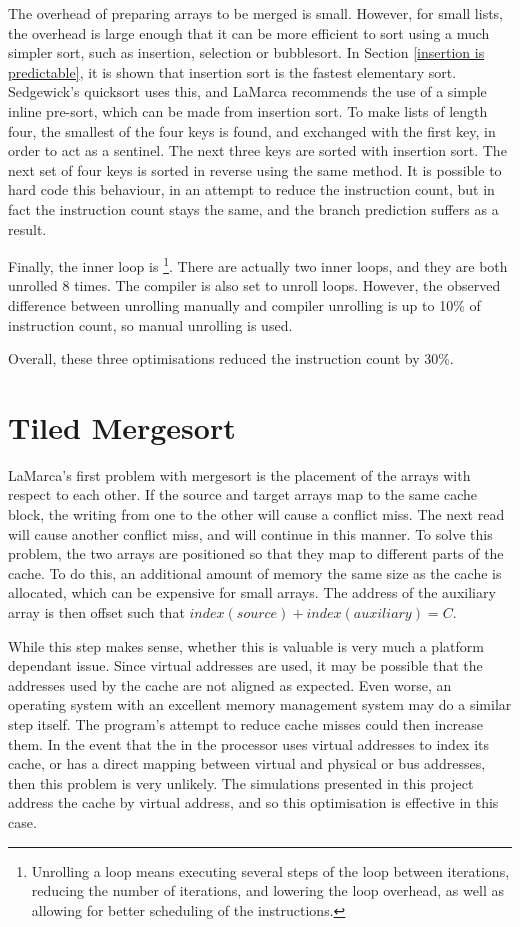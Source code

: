 The overhead of preparing arrays to be merged is small. However, for small
lists, the overhead is large enough that it can be more efficient to sort using
a much simpler sort, such as insertion, selection or bubblesort. In Section
\ref{insertion is predictable}, it is shown that insertion sort is the fastest
elementary sort.  Sedgewick's quicksort uses this, and LaMarca recommends the
use of a simple inline pre-sort, which can be made from insertion sort. To make
lists of length four, the smallest of the four keys is found, and exchanged
with the first key, in order to act as a sentinel. The next three keys are
sorted with insertion sort. The next set of four keys is sorted in reverse
using the same method. It is possible to hard code this behaviour, in an attempt
to reduce the instruction count, but in fact the instruction count stays the
same, and the branch prediction suffers as a result.

Finally, the inner loop is \footnote{Unrolling a loop means
executing several steps of the loop between iterations, reducing the number of
iterations, and lowering the loop overhead, as well as allowing for better
scheduling of the instructions.}.  There are actually two inner loops, and they
are both unrolled 8 times. The compiler is also set to unroll loops. However,
the observed difference between unrolling manually and compiler unrolling is up
to 10\% of instruction count, so manual unrolling is used.

Overall, these three optimisations reduced the instruction count by 30\%.

\section{Tiled Mergesort}
LaMarca's first problem with mergesort is the placement of the arrays with
respect to each other. If the source and target arrays map to the same cache
block, the writing from one to the other will cause a conflict miss. The next
read will cause another conflict miss, and will continue in this manner. To
solve this problem, the two arrays are positioned so that they map to different
parts of the cache. To do this, an additional amount of memory the same size as
the cache is allocated, which can be expensive for small arrays. The address of
the auxiliary array is then offset such that $index(source) + index(auxiliary) =
C$.

While this step makes sense, whether this is valuable is very much a platform
dependant issue. Since virtual addresses are used, it may be possible that the
addresses used by the cache are not aligned as expected. Even worse, an
operating system with an excellent memory management system may do a similar
step itself. The program's attempt to reduce cache misses could then increase
them. In the event that the  in the processor uses
virtual addresses to index its cache, or has a direct mapping between virtual
and physical or bus addresses, then this problem is very unlikely. The
simulations presented in this project address the cache by virtual address, and
so this optimisation is effective in this case.


